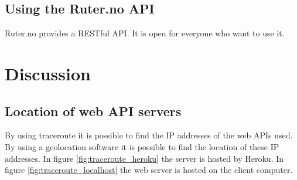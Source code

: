 \documentclass[10pt,a4paper]{article}
\begin{document}
\subsection{Using the Ruter.no API}

\label{sec:using-ruter.no-api}
Ruter.no provides a RESTful API. It is open for everyone who want to use it.

\section{Discussion}

\subsection{Location of web API servers}
By using traceroute it is possible to find the IP addresses of the web APIs used. By using a geolocation software it is possible to find the location of these IP addresses. In figure \ref{fig:traceroute_heroku} the server is hosted by Heroku. In figure \ref{fig:traceroute_localhost} the web server is hosted on the client computer. 
\end{document}
